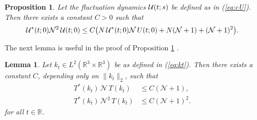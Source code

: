 \documentclass[11pt,a4paper]{article}
\newtheorem{cor}[thm]{Corollary}
\newtheorem{proposition}[thm]{Proposition}
\newtheorem{lemma}[thm]{Lemma}
\newtheorem*{rem}{Remark}
\newcommand{\cU}{{\cal U}}
\newcommand{\bR}{{\mathbb R}}
\newcommand{\R}{\mathbb{R}}
\newcommand{\N}{\mathcal{N}}
\newcommand{\K}{\mathcal{K}}
\newcommand{\fock}{\mathcal{F}}		%
\newcommand{\Ncal}{\mathcal{N}}		%
\newcommand{\scal}[2]{\big<#1,#2\big>} %
\newcommand{\bd}{\begin{displaymath}}			%
\newcommand{\ed}{\end{displaymath}}
\begin{document}
\begin{proposition} \label{prop:apri}
Let the fluctuation dynamics $\cU (t;s)$ be defined as in (\ref{eq:cU}). Then there exists a constant $C > 0$ such that
 \[ \cU^* (t;0) \N^2 \, \cU (t;0) \le C \big( N  \, \cU^* (t;0) \N \, U (t;0) + N (\N+1) + (\N+1)^2 \big).
 \]
\end{proposition}

The next lemma is useful in the proof of Proposition \ref{prop:apri} .
\begin{lemma} \label{lm:TNT}
Let $k_t \in L^2(\R^3 \times \R^3)$ be as defined in (\ref{eq:kt}). Then there exists a constant $C$, depending only on $\| k_t \|_2$, such that 
\begin{align}
    T^* (k_t)  \, \N \, T (k_t) & \le C (\N+1), \label{eq:TNT} \\
    T^* (k_t) \, \N^2 \, T (k_t) & \le C (\N+1)^2. \label{eq:TN2T} %
  \end{align}
for all $t \in \bR$.
\end{lemma}


\end{document}
